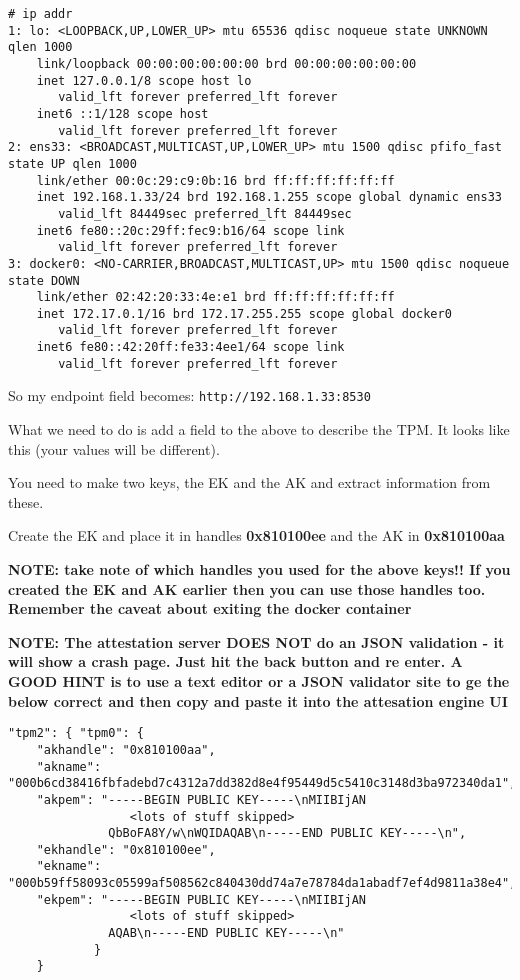 \documentclass[10pt,a4paper]{article}
\begin{document}
\begin{verbatim}
# ip addr
1: lo: <LOOPBACK,UP,LOWER_UP> mtu 65536 qdisc noqueue state UNKNOWN qlen 1000
    link/loopback 00:00:00:00:00:00 brd 00:00:00:00:00:00
    inet 127.0.0.1/8 scope host lo
       valid_lft forever preferred_lft forever
    inet6 ::1/128 scope host 
       valid_lft forever preferred_lft forever
2: ens33: <BROADCAST,MULTICAST,UP,LOWER_UP> mtu 1500 qdisc pfifo_fast state UP qlen 1000
    link/ether 00:0c:29:c9:0b:16 brd ff:ff:ff:ff:ff:ff
    inet 192.168.1.33/24 brd 192.168.1.255 scope global dynamic ens33
       valid_lft 84449sec preferred_lft 84449sec
    inet6 fe80::20c:29ff:fec9:b16/64 scope link 
       valid_lft forever preferred_lft forever
3: docker0: <NO-CARRIER,BROADCAST,MULTICAST,UP> mtu 1500 qdisc noqueue state DOWN 
    link/ether 02:42:20:33:4e:e1 brd ff:ff:ff:ff:ff:ff
    inet 172.17.0.1/16 brd 172.17.255.255 scope global docker0
       valid_lft forever preferred_lft forever
    inet6 fe80::42:20ff:fe33:4ee1/64 scope link 
       valid_lft forever preferred_lft forever
\end{verbatim}


So my endpoint field becomes: \texttt{http://192.168.1.33:8530}

What we need to do is add a field to the above to describe the TPM. It looks like this (your values will be different).  

You need to make two keys, the EK and the AK and extract information from these. 

Create the EK and place it in handles \textbf{0x810100ee} and the AK in \textbf{0x810100aa}

\textbf{NOTE: take note of which handles you used for the above keys!! If you created the EK and AK earlier then you can use those handles too. Remember the caveat about exiting the docker container}

\textbf{NOTE: The attestation server DOES NOT do an JSON validation - it will show a crash page. Just hit the back button and re enter. A GOOD HINT is to use a text editor or a JSON validator site to ge the below correct and then copy and paste it into the attesation engine UI}

\begin{verbatim}
"tpm2": { "tpm0": {
    "akhandle": "0x810100aa",
    "akname": "000b6cd38416fbfadebd7c4312a7dd382d8e4f95449d5c5410c3148d3ba972340da1",
    "akpem": "-----BEGIN PUBLIC KEY-----\nMIIBIjAN 
                 <lots of stuff skipped>
              QbBoFA8Y/w\nWQIDAQAB\n-----END PUBLIC KEY-----\n",
    "ekhandle": "0x810100ee",
    "ekname": "000b59ff58093c05599af508562c840430dd74a7e78784da1abadf7ef4d9811a38e4",
    "ekpem": "-----BEGIN PUBLIC KEY-----\nMIIBIjAN
                 <lots of stuff skipped>    
              AQAB\n-----END PUBLIC KEY-----\n"
            } 
    } 
\end{verbatim}
\end{document}
